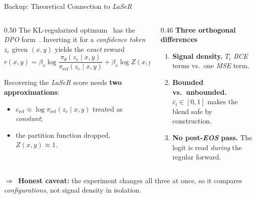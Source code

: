 \documentclass[aspectratio=169,10pt,t]{beamer}
\DeclareRobustCommand{\acit}[1]{\textit{\acs{#1}}}
\newcommand{\takeaway}[1]{%
	\vfill
	\setlength{\fboxsep}{4pt}%
	\noindent\colorbox{jkulight}{%
		\begin{minipage}{\dimexpr\textwidth-2\fboxsep\relax}%
			\footnotesize\raggedright\color{jkunavy}%
			\textcolor{jkumagenta}{\textbf{$\Rightarrow$}}~#1%
		\end{minipage}}%
	\vspace{1pt}%
}
\newcommand{\lead}[1]{{\color{jkunavy}\textbf{#1}}\par\vspace{1pt}}
\newcommand{\hl}[1]{\textcolor{jkumagenta}{\textbf{#1}}}
\newcommand{\nv}[1]{\textcolor{jkunavy}{\textbf{#1}}}
\begin{document}
\begin{frame}[noframenumbering]{Backup: Theoretical Connection to \acit{LaSeR}}
	\begin{columns}[T, onlytextwidth]
		\begin{column}{0.50\textwidth}
			The KL-regularized optimum~\citep{rlhf} has the \acit{DPO} form~\citep{directpreferenceopt}. Inverting it for a \emph{confidence token} $z_c$ given $(x,y)$ yields the \emph{exact} reward
			\vspace{-0.1cm}
			\[
				r(x,y)=\beta_v\log\frac{\pi_\theta(z_c\mid x,y)}{\pi_{\mathrm{ref}}(z_c\mid x,y)}+\beta_v\log Z(x,y).
			\]
			\vspace{-0.35cm}
			\par Recovering the \acit{LaSeR} score needs \hl{two approximations}:
			\begin{itemize}
				\item $c_{\mathrm{ref}}\approx\log\pi_{\mathrm{ref}}(z_c\mid x,y)$ treated as \emph{constant};
				\item the partition function dropped, $Z(x,y)\approx 1$.
			\end{itemize}
		\end{column}
		\begin{column}{0.46\textwidth}
			\lead{Three orthogonal differences}
			\begin{enumerate}
				\setlength{\itemsep}{3pt}
				\item \nv{Signal density.} $T_i$ \acit{BCE} terms vs.\ one \acit{MSE} term.
				\item \nv{Bounded vs.\ unbounded.} $\bar c_i\in[0,1]$ makes the blend safe by construction.
				\item \nv{No post-\acit{EOS} pass.} The logit is read \emph{during} the regular forward.
			\end{enumerate}
		\end{column}
	\end{columns}
	\takeaway{\textbf{Honest caveat:} the experiment changes all three at once, so it compares \emph{configurations}, not signal density in isolation.}
\end{frame}
\end{document}
